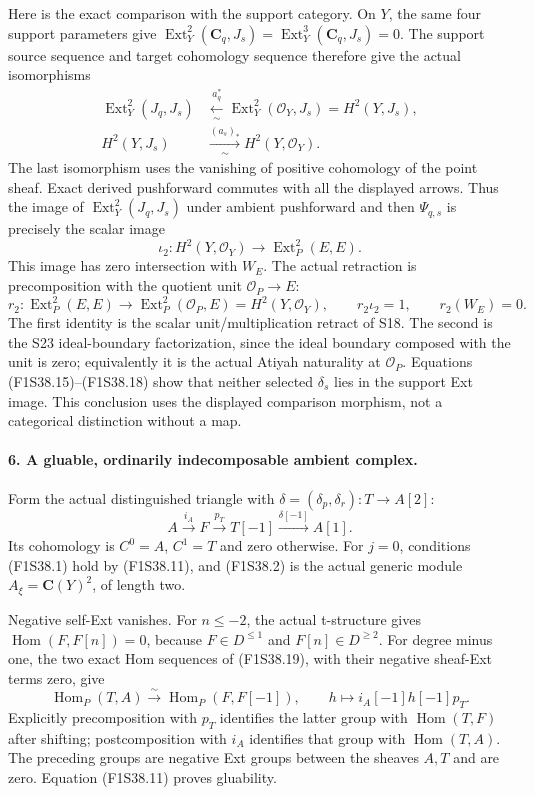 Here is the exact comparison with the support category.
On $Y$, the same four support parameters give
$\operatorname{Ext}^2_Y(\mathbf C_q,J_s)=
\operatorname{Ext}^3_Y(\mathbf C_q,J_s)=0$.
The support source sequence and target cohomology sequence
therefore give the actual isomorphisms
\[
\begin{split}
 \operatorname{Ext}^2_Y(J_q,J_s)
    &\xleftarrow[\sim]{a_q^*}
                   \operatorname{Ext}^2_Y(\mathcal O_Y,J_s)
                         =H^2(Y,J_s),\\
 H^2(Y,J_s)&\xrightarrow[\sim]{(a_s)_*}H^2(Y,\mathcal O_Y).
\end{split}
 \tag{F1S38.16}
\]
The last isomorphism uses the vanishing of positive cohomology
of the point sheaf. Exact derived pushforward commutes with
all the displayed arrows. Thus the image of
$\operatorname{Ext}^2_Y(J_q,J_s)$ under ambient pushforward
and then $\Psi_{q,s}$ is precisely the scalar image
\[
 \iota_2:H^2(Y,\mathcal O_Y)\longrightarrow
                            \operatorname{Ext}^2_P(E,E).
 \tag{F1S38.17}
\]
This image has zero intersection with $W_E$.
The actual retraction is precomposition with the quotient unit
$\mathcal O_P\to E$:
\[
 r_2:\operatorname{Ext}^2_P(E,E)\longrightarrow
            \operatorname{Ext}^2_P(\mathcal O_P,E)=H^2(Y,\mathcal O_Y),
 \qquad r_2\iota_2=1,\qquad r_2(W_E)=0.
 \tag{F1S38.18}
\]
The first identity is the scalar unit/multiplication retract of
S18. The second is the S23 ideal-boundary factorization, since
the ideal boundary composed with the unit is zero; equivalently
it is the actual Atiyah naturality at $\mathcal O_P$.
Equations (F1S38.15)--(F1S38.18) show that neither selected
$\delta_s$ lies in the support Ext image. This conclusion uses
the displayed comparison morphism, not a categorical distinction
without a map.

\paragraph{6. A gluable, ordinarily indecomposable ambient complex.}
Form the actual distinguished triangle with
$\delta=(\delta_p,\delta_r):T\to A[2]$:
\[
 A\xrightarrow{i_A}F\xrightarrow{p_T}T[-1]
                       \xrightarrow{\delta[-1]}A[1].
 \tag{F1S38.19}
\]
Its cohomology is $C^0=A$, $C^1=T$ and zero otherwise.
For $j=0$, conditions (F1S38.1) hold by (F1S38.11), and
(F1S38.2) is the actual generic module
$A_\xi=\mathbf C(Y)^2$, of length two.

Negative self-Ext vanishes. For $n\le-2$, the actual
t-structure gives
$\operatorname{Hom}(F,F[n])=0$, because
$F\in D^{\le1}$ and $F[n]\in D^{\ge2}$.
For degree minus one, the two exact Hom sequences of
(F1S38.19), with their negative sheaf-Ext terms zero, give
\[
 \operatorname{Hom}_P(T,A)\xrightarrow{\sim}
              \operatorname{Hom}_P(F,F[-1]),\qquad
 h\longmapsto i_A[-1]h[-1]p_T.
 \tag{F1S38.20}
\]
Explicitly precomposition with $p_T$ identifies the latter
group with $\operatorname{Hom}(T,F)$ after shifting;
postcomposition with $i_A$ identifies that group with
$\operatorname{Hom}(T,A)$. The preceding groups are negative
Ext groups between the sheaves $A,T$ and are zero.
Equation (F1S38.11) proves gluability.

